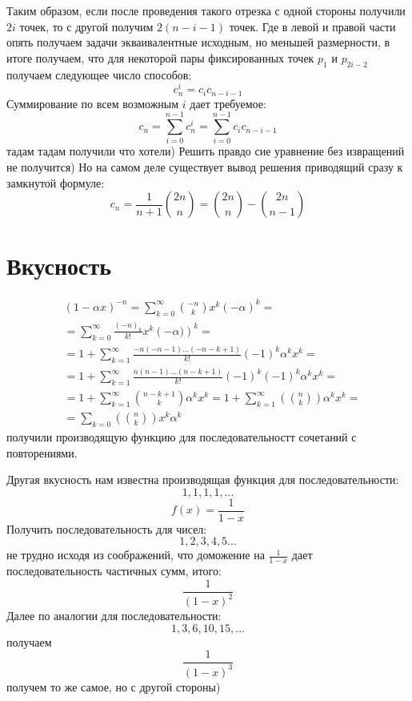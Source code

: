 Таким образом, если после проведения такого отрезка с одной стороны получили $2 i$ точек, то с другой получим $2 \left(n - i - 1\right)$ точек. Где в левой и правой части опять получаем задачи экваивалентные исходным, но меньшей размерности, в итоге получаем, что для некоторой пары фиксированных точек $p_1$ и $p_{2 i - 2}$ получаем следующее число способов:
\[
	c_{n}^i = c_i c_{n-i-1}
\]
Суммирование по всем возможным $i$ дает требуемое:
\[
	c_{n} = \sum_{i=0}^{n-1} c_{n}^i = \sum_{i=0}^{n-1} c_i c_{n-i-1}
\]
тадам тадам получили что хотели) Решить правдо сие уравнение без извращений не получится) Но на самом деле существует вывод решения приводящий сразу к замкнутой формуле:
\[
	c_{n} = \frac{1}{n+1} \binom{2n}{n} = \binom{2n}{n} - \binom{2n}{n-1}
\]

\section{Вкусность}
\[
	\begin{split}
		& \left(1 - \alpha x\right)^{-n} = \sum_{k=0}^{\infty} \binom{-n}{k} x^k \left(-\alpha\right)^k = \\
		& =  \sum_{k=0}^{\infty} \frac{\left(-n\right)_k}{k!} x^k \left(-\alpha)\right)^k = \\
		& = 1 + \sum_{k=1}^{\infty} \frac{-n \left(-n - 1\right) ... \left(- n - k + 1\right)}{k!} \left(-1\right)^k \alpha^k x^k = \\
		& = 1 + \sum_{k=1}^{\infty} \frac{n\left(n-1\right)...\left(n-k+1\right)}{k!} \left(-1\right)^k \left(-1\right)^k \alpha^k x^k = \\
		& = 1 + \sum_{k=1}^{\infty} \binom{n-k+1}{k} \alpha^k x^k = 1 + \sum_{k=1}^{\infty} \left(\binom{n}{k}\right) \alpha^k x^k = \\
		& = \sum_{k=0} \left(\binom{n}{k}\right) x^k \alpha^k
	\end{split}
\]
получили производящую функцию для последовательностт сочетаний с повторениями.

Другая вкусность нам известна производящая функция для последовательности:
\[
	1, 1, 1, 1, ...
\]
\[
	f\left(x\right) = \frac{1}{1 - x}
\]
Получить последовательность для чисел:
\[
	1, 2, 3, 4, 5 ...
\]
не трудно исходя из соображений, что доможение на $\frac{1}{1-x}$ дает последовательность частичных сумм, итого:
\[
	\frac{1}{\left(1-x\right)^2}
\]
Далее по аналогии для последовательности:
\[
	1, 3, 6, 10, 15, ...
\]
получаем
\[
	\frac{1}{\left(1-x\right)^3}
\]
получем то же самое, но с другой стороны)

